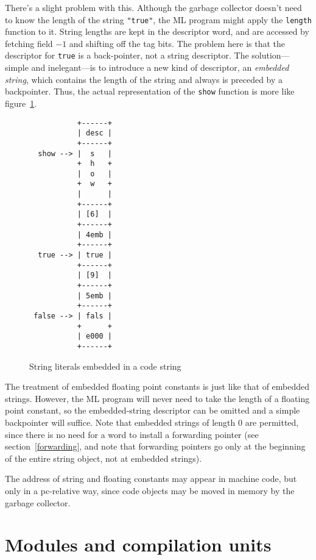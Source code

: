There's a slight problem with this.  Although the garbage collector doesn't
need to know the length of the string \verb|"true"|, the ML program might
apply the \verb"length" function to it.  
String lengths are kept in the
descriptor word, and are accessed by fetching field $-1$ and shifting
off the tag bits.  The problem here is that the descriptor for \verb"true"
is a back-pointer,
not a string descriptor.  The solution---simple and
inelegant---is to introduce a new kind of descriptor, an {\em embedded
string}, which contains the length of the string and always is preceded
by a backpointer.  Thus, the actual representation of the \verb"show"
function is more like figure~\ref{embedded3}.
\begin{figure}[htbp]
\label{embedded3}
\begin{verbatim}
           +------+
           | desc |
           +------+
  show --> |  s   |
           +  h   +
           |  o   |
           +  w   +
           |      |
           +------+
           | [6]  |
           +------+
           | 4emb |
           +------+
  true --> | true |
           +------+
           | [9]  |
           +------+
           | 5emb |
           +------+
 false --> | fals |
           +      +
           | e000 |
           +------+
\end{verbatim}
\caption{String literals embedded in a code string}
\end{figure}

The treatment of embedded 
floating point constants is just like that of
embedded strings.  However, the ML program will never need to take the
length of a floating point constant, so the embedded-string descriptor
can be omitted and a simple backpointer will suffice.
Note that embedded strings of length 0 are permitted, since there
is no need for a word to install a forwarding pointer (see 
section~\ref{forwarding},
and note that forwarding pointers go only at the beginning of the
entire string object, not at embedded strings).

The address of string and floating constants may appear in machine code,
but only in a pc-relative way, since code objects may be moved in memory
by the garbage collector.

\section{Modules and compilation units}
\label{modules}

